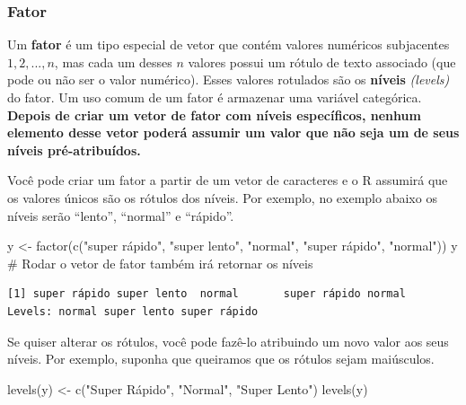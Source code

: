 \documentclass[
  letterpaper,
  DIV=11,
  numbers=noendperiod]{scrreprt}
\newenvironment{Shaded}{\begin{snugshade}}{\end{snugshade}}
\newcommand{\CommentTok}[1]{\textcolor[rgb]{0.37,0.37,0.37}{#1}}
\newcommand{\FunctionTok}[1]{\textcolor[rgb]{0.28,0.35,0.67}{#1}}
\newcommand{\NormalTok}[1]{\textcolor[rgb]{0.00,0.23,0.31}{#1}}
\newcommand{\OtherTok}[1]{\textcolor[rgb]{0.00,0.23,0.31}{#1}}
\newcommand{\StringTok}[1]{\textcolor[rgb]{0.13,0.47,0.30}{#1}}
\begin{document}
\subsubsection{Fator}\label{fator}

Um \textbf{fator} é um tipo especial de vetor que contém valores
numéricos subjacentes \(1, 2,..., n\), mas cada um desses \(n\) valores
possui um rótulo de texto associado (que pode ou não ser o valor
numérico). Esses valores rotulados são os \textbf{níveis}
\emph{(levels)} do fator. Um uso comum de um fator é armazenar uma
variável categórica. \textbf{Depois de criar um vetor de fator com
níveis específicos, nenhum elemento desse vetor poderá assumir um valor
que não seja um de seus níveis pré-atribuídos.}

Você pode criar um fator a partir de um vetor de caracteres e o R
assumirá que os valores únicos são os rótulos dos níveis. Por exemplo,
no exemplo abaixo os níveis serão ``lento'', ``normal'' e ``rápido''.

\begin{Shaded}
\begin{Highlighting}[]
\NormalTok{y }\OtherTok{\textless{}{-}} \FunctionTok{factor}\NormalTok{(}\FunctionTok{c}\NormalTok{(}\StringTok{"super rápido"}\NormalTok{, }\StringTok{"super lento"}\NormalTok{, }\StringTok{"normal"}\NormalTok{, }\StringTok{"super rápido"}\NormalTok{, }\StringTok{"normal"}\NormalTok{))}
\NormalTok{y         }\CommentTok{\# Rodar o vetor de fator também irá retornar os níveis}
\end{Highlighting}
\end{Shaded}

\begin{verbatim}
[1] super rápido super lento  normal       super rápido normal      
Levels: normal super lento super rápido
\end{verbatim}

Se quiser alterar os rótulos, você pode fazê-lo atribuindo um novo valor
aos seus níveis. Por exemplo, suponha que queiramos que os rótulos sejam
maiúsculos.

\begin{Shaded}
\begin{Highlighting}[]
\FunctionTok{levels}\NormalTok{(y) }\OtherTok{\textless{}{-}} \FunctionTok{c}\NormalTok{(}\StringTok{"Super Rápido"}\NormalTok{, }\StringTok{"Normal"}\NormalTok{, }\StringTok{"Super Lento"}\NormalTok{) }
\FunctionTok{levels}\NormalTok{(y)}
\end{Highlighting}
\end{Shaded}
\end{document}

